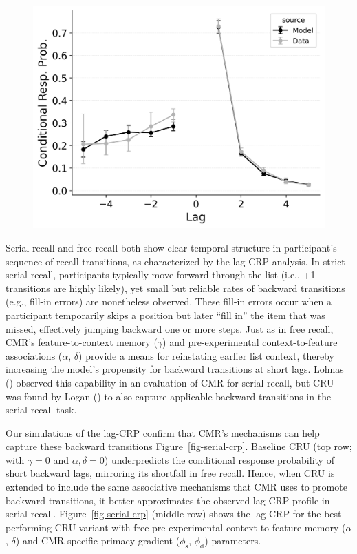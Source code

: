 \documentclass[
  man,
  floatsintext,
  longtable,
  nolmodern,
  notxfonts,
  notimes,
  draftfirst,
  colorlinks=true,linkcolor=blue,citecolor=blue,urlcolor=blue]{apa7}
\begin{document}
\begin{figure}
\begin{minipage}{0.33\linewidth}
\includegraphics{figures/bw_Gordon2021_BaseCMR_Confusable_Fitting_crp_LL7.png}\end{minipage}%

\end{figure}%

Serial recall and free recall both show clear temporal structure in
participant's sequence of recall transitions, as characterized by the
lag-CRP analysis. In strict serial recall, participants typically move
forward through the list (i.e., +1 transitions are highly likely), yet
small but reliable rates of backward transitions (e.g., fill-in errors)
are nonetheless observed. These fill-in errors occur when a participant
temporarily skips a position but later ``fill in'' the item that was
missed, effectively jumping backward one or more steps. Just as in free
recall, CMR's feature-to-context memory (\(\gamma\)) and
pre-experimental context-to-feature associations (\(\alpha\),
\(\delta\)) provide a means for reinstating earlier list context,
thereby increasing the model's propensity for backward transitions at
short lags. Lohnas () observed
this capability in an evaluation of CMR for serial recall, but CRU was
found by Logan () to also capture
applicable backward transitions in the serial recall task.

Our simulations of the lag-CRP confirm that CMR's mechanisms can help
capture these backward transitions Figure~\ref{fig-serial-crp}. Baseline
CRU (top row; with \(\gamma=0\) and \(\alpha, \delta=0\)) underpredicts
the conditional response probability of short backward lags, mirroring
its shortfall in free recall. Hence, when CRU is extended to include the
same associative mechanisms that CMR uses to promote backward
transitions, it better approximates the observed lag-CRP profile in
serial recall. Figure~\ref{fig-serial-crp} (middle row) shows the
lag-CRP for the best performing CRU variant with free pre-experimental
context-to-feature memory (\(\alpha\), \(\delta\)) and CMR-specific
primacy gradient (\(\phi_\text{s}\), \(\phi_\text{d}\)) parameters.
\end{document}
